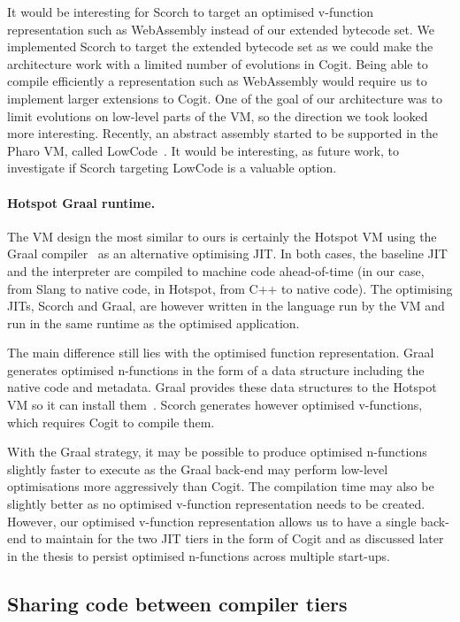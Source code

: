 \documentclass[a4paper,12pt,twoside]{../includes/ThesisStyle}
\begin{document}
It would be interesting for Scorch to target an optimised v-function representation such as WebAssembly instead of our extended bytecode set. We implemented Scorch to target the extended bytecode set as we could make the architecture work with a limited number of evolutions in Cogit. Being able to compile efficiently a representation such as WebAssembly would require us to implement larger extensions to Cogit. One of the goal of our architecture was to limit evolutions on low-level parts of the VM, so the direction we took looked more interesting. Recently, an abstract assembly started to be supported in the Pharo VM, called LowCode~\cite{Salg16a}. It would be interesting, as future work, to investigate if Scorch targeting LowCode is a valuable option.

\paragraph{Hotspot Graal runtime.}
The VM design the most similar to ours is certainly the Hotspot VM using the Graal compiler~\cite{Oracle13,Dubo13c} as an alternative optimising JIT. In both cases, the baseline JIT and the interpreter are compiled to machine code ahead-of-time (in our case, from Slang to native code, in Hotspot, from C++ to native code). The optimising JITs, Scorch and Graal, are however written in the language run by the VM and run in the same runtime as the optimised application. 

The main difference still lies with the optimised function representation. Graal generates optimised n-functions in the form of a data structure including the native code and metadata. Graal provides these data structures to the Hotspot VM so it can install them~\cite{Grim13a}. Scorch generates however optimised v-functions, which requires Cogit to compile them. 

With the Graal strategy, it may be possible to produce optimised n-functions slightly faster to execute as the Graal back-end may perform low-level optimisations more aggressively than Cogit. The compilation time may also be slightly better as no optimised v-function representation needs to be created. However, our optimised v-function representation allows us to have a single back-end to maintain for the two JIT tiers in the form of Cogit and as discussed later in the thesis to persist optimised n-functions across multiple start-ups.

\subsection{Sharing code between compiler tiers}
\label{sec:codeSharing}
\end{document}
